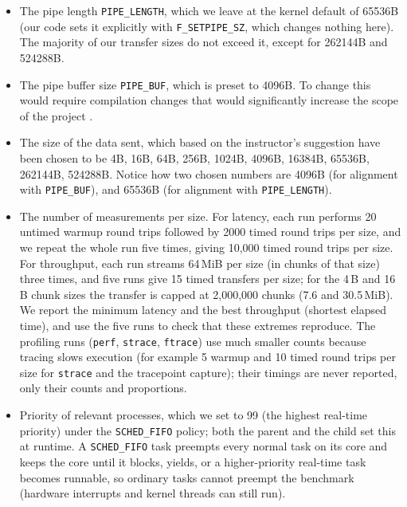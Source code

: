 \documentclass[11pt,sigconf,nonacm]{acmart}
\begin{document}
\begin{itemize}
    \item The pipe length \texttt{PIPE\_LENGTH}, which we leave at the kernel default of 65536B (our code sets it explicitly with \texttt{F\_SETPIPE\_SZ}, which changes nothing here). The majority of our transfer sizes do not exceed it, except for 262144B and 524288B.
    \item The pipe buffer size \texttt{PIPE\_BUF}, which is preset to 4096B. To change this would require compilation changes that would significantly increase the scope of the project \cite{linux_limits_h}.
    \item The size of the data sent, which based on the instructor's suggestion have been chosen to be 4B, 16B, 64B, 256B, 1024B, 4096B, 16384B, 65536B, 262144B, 524288B. Notice how two chosen numbers are 4096B (for alignment with \texttt{PIPE\_BUF}), and 65536B (for alignment with \texttt{PIPE\_LENGTH}).
    \item The number of measurements per size. For latency, each run performs 20 untimed warmup round trips followed by 2000 timed round trips per size, and we repeat the whole run five times, giving 10,000 timed round trips per size. For throughput, each run streams 64\,MiB per size (in chunks of that size) three times, and five runs give 15 timed transfers per size; for the 4\,B and 16\,B chunk sizes the transfer is capped at 2,000,000 chunks (7.6 and 30.5\,MiB). We report the minimum latency and the best throughput (shortest elapsed time), and use the five runs to check that these extremes reproduce. The profiling runs (\texttt{perf}, \texttt{strace}, \texttt{ftrace}) use much smaller counts because tracing slows execution (for example 5 warmup and 10 timed round trips per size for \texttt{strace} and the tracepoint capture); their timings are never reported, only their counts and proportions.
    \item Priority of relevant processes, which we set to 99 (the highest real-time priority) under the \texttt{SCHED\_FIFO} policy; both the parent and the child set this at runtime. A \texttt{SCHED\_FIFO} task preempts every normal task on its core and keeps the core until it blocks, yields, or a higher-priority real-time task becomes runnable, so ordinary tasks cannot preempt the benchmark (hardware interrupts and kernel threads can still run).

\end{itemize}
\end{document}
